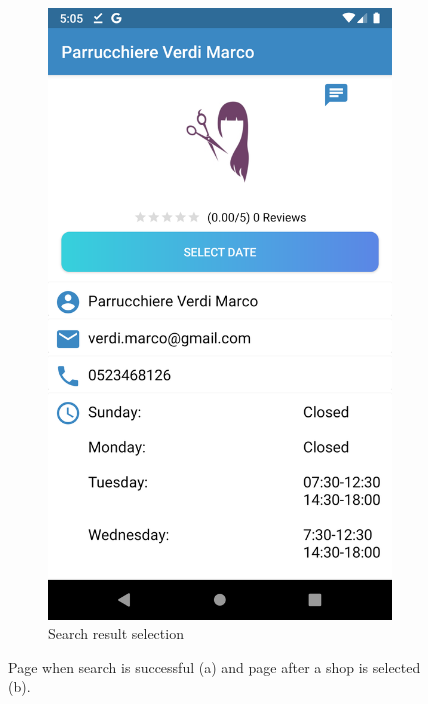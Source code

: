 \begin{figure}[h]
\begin{subfigure}{.5\textwidth}
  \includegraphics[height=.4\textheight, keepaspectratio=true]{Img/Screens/Customer_Search_Selected}
  \caption{Search result selection}
\end{subfigure}%
\caption{Page when search is successful (a) and page after a shop is selected (b).}
\end{figure}

